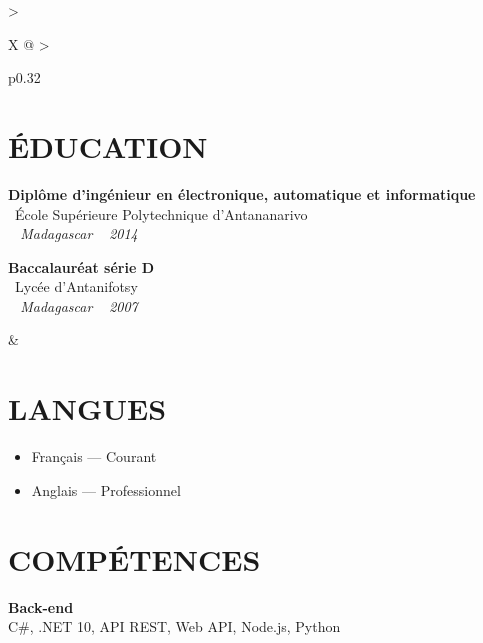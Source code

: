 \documentclass[10pt,a4paper]{article}
\begin{document}
\setlength{\tabcolsep}{0pt}
\begin{tabularx}{\textwidth}{
  >{\raggedright\arraybackslash}X
  @{\hspace{1cm}}
  >{\raggedright\arraybackslash}p{0.32\textwidth}
}
\begin{minipage}[t]{\linewidth}
\section*{ÉDUCATION}

\textbf{Diplôme d'ingénieur en électronique, automatique et informatique}\\
\textcolor{primary}{ \faGraduationCap\ École Supérieure Polytechnique d'Antananarivo}\\
\textit{ \small \textcolor{darkgray}{ \faMapMarker\ } Madagascar } \hfill  \textit{ \small \textcolor{darkgray}{ \faCalendar\ } 2014 }

\vspace{6pt}

\textbf{Baccalauréat série D}\\
\textcolor{primary}{ \faGraduationCap\ Lycée d'Antanifotsy}\\
\textit{ \small \textcolor{darkgray}{ \faMapMarker\ } Madagascar } \hfill  \textit{ \small \textcolor{darkgray}{ \faCalendar\ } 2007 }
\end{minipage}
&
\begin{minipage}[t]{\linewidth}

\section*{LANGUES}

\begin{itemize}
  \item Français --- Courant
  \item Anglais --- Professionnel
\end{itemize}

\section*{COMPÉTENCES}

\textbf{\color{primary} Back-end}\\
\color{darkgray} C\#, .NET 10, API REST, Web API, Node.js, Python

\vspace{4pt}


\end{minipage}
\end{tabularx}
\end{document}
